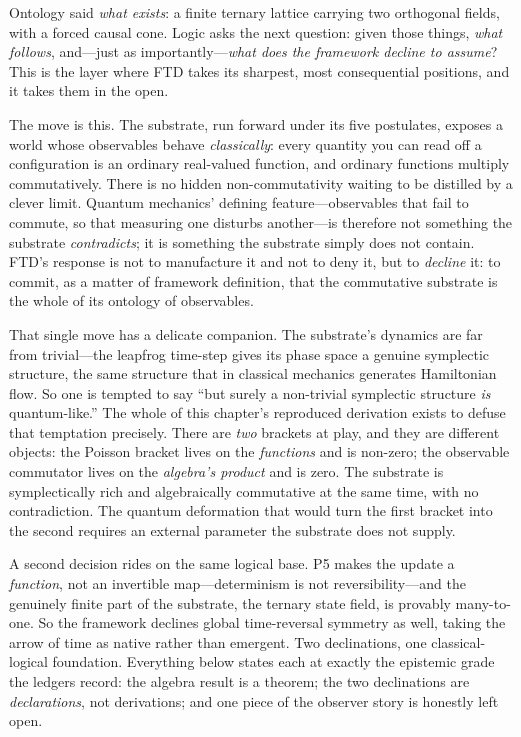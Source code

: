 \noindent
Ontology said \emph{what exists}: a finite ternary lattice carrying two
orthogonal fields, with a forced causal cone. Logic asks the next question:
given those things, \emph{what follows}, and---just as importantly---\emph{what
does the framework decline to assume}? This is the layer where FTD takes its
sharpest, most consequential positions, and it takes them in the open.

The move is this. The substrate, run forward under its five postulates, exposes
a world whose observables behave \emph{classically}: every quantity you can read
off a configuration is an ordinary real-valued function, and ordinary functions
multiply commutatively. There is no hidden non-commutativity waiting to be
distilled by a clever limit. Quantum mechanics' defining feature---observables
that fail to commute, so that measuring one disturbs another---is therefore not
something the substrate \emph{contradicts}; it is something the substrate simply
does not contain. FTD's response is not to manufacture it and not to deny it,
but to \emph{decline} it: to commit, as a matter of framework definition, that
the commutative substrate is the whole of its ontology of observables.

That single move has a delicate companion. The substrate's dynamics are far
from trivial---the leapfrog time-step gives its phase space a genuine symplectic
structure, the same structure that in classical mechanics generates Hamiltonian
flow. So one is tempted to say ``but surely a non-trivial symplectic structure
\emph{is} quantum-like.'' The whole of this chapter's reproduced derivation
exists to defuse that temptation precisely. There are \emph{two} brackets at
play, and they are different objects: the Poisson bracket lives on the
\emph{functions} and is non-zero; the observable commutator lives on the
\emph{algebra's product} and is zero. The substrate is symplectically rich and
algebraically commutative at the same time, with no contradiction. The quantum
deformation that would turn the first bracket into the second requires an
external parameter the substrate does not supply.

A second decision rides on the same logical base. P5 makes the update a
\emph{function}, not an invertible map---determinism is not reversibility---and
the genuinely finite part of the substrate, the ternary state field, is provably
many-to-one. So the framework declines global time-reversal symmetry as well,
taking the arrow of time as native rather than emergent. Two declinations, one
classical-logical foundation. Everything below states each at exactly the
epistemic grade the ledgers record: the algebra result is a theorem; the two
declinations are \emph{declarations}, not derivations; and one piece of the
observer story is honestly left open.

